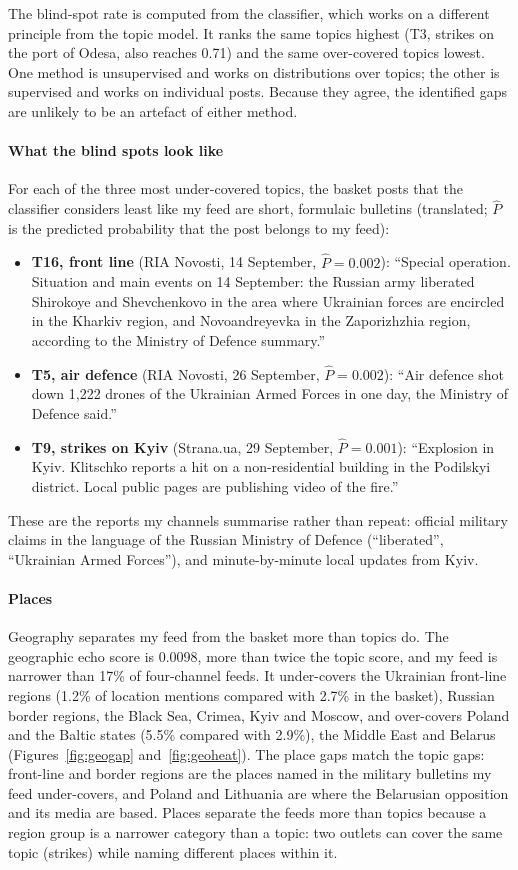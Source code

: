 \documentclass[11pt,a4paper]{article}
\begin{document}
The blind-spot rate is computed from the classifier, which works on a different principle from the topic model. It ranks the same topics highest (T3, strikes on the port of Odesa, also reaches 0.71) and the same over-covered topics lowest. One method is unsupervised and works on distributions over topics; the other is supervised and works on individual posts. Because they agree, the identified gaps are unlikely to be an artefact of either method.

\paragraph{What the blind spots look like} For each of the three most under-covered topics, the basket posts that the classifier considers least like my feed are short, formulaic bulletins (translated; $\hat P$ is the predicted probability that the post belongs to my feed):
\begin{itemize}
\item \textbf{T16, front line} (RIA Novosti, 14 September, $\hat P=0.002$): ``Special operation. Situation and main events on 14 September: the Russian army liberated Shirokoye and Shevchenkovo in the area where Ukrainian forces are encircled in the Kharkiv region, and Novoandreyevka in the Zaporizhzhia region, according to the Ministry of Defence summary.''
\item \textbf{T5, air defence} (RIA Novosti, 26 September, $\hat P=0.002$): ``Air defence shot down 1,222 drones of the Ukrainian Armed Forces in one day, the Ministry of Defence said.''
\item \textbf{T9, strikes on Kyiv} (Strana.ua, 29 September, $\hat P=0.001$): ``Explosion in Kyiv. Klitschko reports a hit on a non-residential building in the Podilskyi district. Local public pages are publishing video of the fire.''
\end{itemize}
These are the reports my channels summarise rather than repeat: official military claims in the language of the Russian Ministry of Defence (``liberated'', ``Ukrainian Armed Forces''), and minute-by-minute local updates from Kyiv.

\paragraph{Places} Geography separates my feed from the basket more than topics do. The geographic echo score is 0.0098, more than twice the topic score, and my feed is narrower than 17\% of four-channel feeds. It under-covers the Ukrainian front-line regions (1.2\% of location mentions compared with 2.7\% in the basket), Russian border regions, the Black Sea, Crimea, Kyiv and Moscow, and over-covers Poland and the Baltic states (5.5\% compared with 2.9\%), the Middle East and Belarus (Figures~\ref{fig:geogap} and~\ref{fig:geoheat}). The place gaps match the topic gaps: front-line and border regions are the places named in the military bulletins my feed under-covers, and Poland and Lithuania are where the Belarusian opposition and its media are based. Places separate the feeds more than topics because a region group is a narrower category than a topic: two outlets can cover the same topic (strikes) while naming different places within it.
\end{document}
